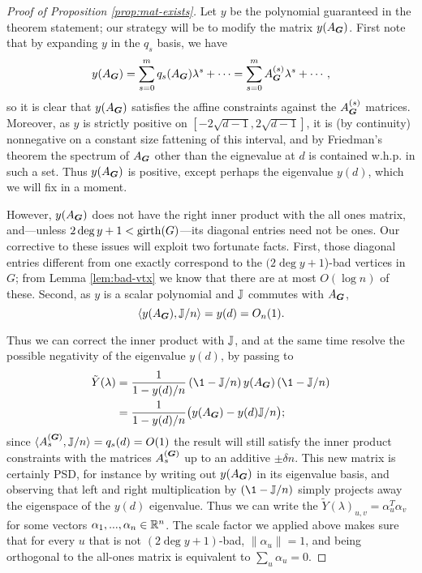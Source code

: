 \begin{proof}[Proof of Proposition \ref{prop:mat-exists}]
    Let $y$ be the polynomial guaranteed in the theorem statement; our strategy will be to modify the matrix $y(A_{\boldsymbol{G}})$. First note that by expanding $y$ in the $q_s$ basis, we have
    $$
        y(A_{\boldsymbol{G}}) = \sum_{s = 0}^m q_s(A_{\boldsymbol{G}})\lambda^s + \cdots = \sum_{s=0}^m A^{(s)}_{\boldsymbol{G}}\lambda^s + \cdots,
    $$
    so it is clear that $y(A_{\boldsymbol{G}})$ satisfies the affine constraints against the $A^{(s)}_{\boldsymbol{G}}$ matrices. Moreover, as $y$ is strictly positive on $[-2\sqrt{d-1},2\sqrt{d-1}]$, it is (by continuity) nonnegative on a constant size fattening of this interval, and by Friedman's theorem the spectrum of $A_{\boldsymbol{G}}$ other than the eignevalue at $d$ is contained w.h.p. in such a set. Thus $y(A_{\boldsymbol{G}})$ is positive, except perhaps the eigenvalue $y(d)$, which we will fix in a moment.
    
    However, $y(A_{\boldsymbol{G}})$ does not have the right inner product with the all ones matrix, and---unless $2\deg y + 1 < \operatorname{girth}(G)$---its diagonal entries need not be ones. Our corrective to these issues will exploit two fortunate facts. First, those diagonal entries different from one exactly correspond to the $(2\deg y + 1$)-bad vertices in $G$; from Lemma \ref{lem:bad-vtx} we know that there are at most $O(\log n)$ of these. Second, as $y$ is a scalar polynomial and $\mathbb{J}$ commutes with $A_{\boldsymbol{G}}$,
    $$
        \langle y (A_{\boldsymbol{G}}),\mathbb{J}/n \rangle = y(d) = O_n(1).
    $$
    
    Thus we can correct the inner product with $\mathbb{J}$, and at the same time resolve the possible negativity of the eigenvalue $y(d)$, by passing to
    \begin{align*}
         \tilde Y(\lambda) 
         &= \frac{1}{1 - y(d)/n} \left(\1 - \bbJ/n\right) y(A_{\bG})\left(\1 - \bbJ/n\right) \\
         &= \frac{1}{1 - y(d)/n} \big(y(A_{\bG}) - y(d)\bbJ/n\big);
    \end{align*}
    since $\langle A^{(\boldsymbol{G})}_{s},\mathbb{J}/n\rangle = q_s(d) = O(1)$ the result will still satisfy the inner product constraints with the matrices $A^{(\boldsymbol{G})}_{s}$ up to an additive $\pm \delta n$. This new matrix is certainly PSD, for instance by writing out $y(A_{\boldsymbol{G}})$ in its eigenvalue basis, and observing that left and right multiplication by $(\1 - \bbJ/n)$ simply projects away the eigenspace of the $y(d)$ eigenvalue. Thus we can write the $\tilde Y(\lambda)_{u,v} = \alpha_u^T\alpha_v$ for some vectors $\alpha_1,...,\alpha_n \in \mathbb{R}^n$. The scale factor we applied above makes sure that for every $u$ that is not $(2\deg y + 1)$-bad, $\|\alpha_u\| = 1$, and being orthogonal to the all-ones matrix is equivalent to $\sum_u \alpha_u = 0$.
    

\end{proof}
